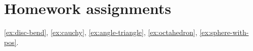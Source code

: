 \chapter*{Homework assignments}

\ref{ex:disc-bend},
\ref{ex:cauchy},
\ref{ex:angle-triangle},
\ref{ex:octahedron},
\ref{ex:sphere-with-pos}.
